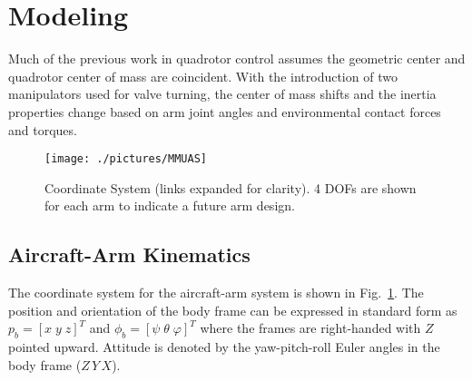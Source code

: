 \section{Modeling}\label{sec:model}
Much of the previous work in quadrotor control assumes the geometric center and quadrotor center of mass are coincident. With the introduction of two manipulators used for valve turning, the center of mass shifts and the inertia properties change based on arm joint angles and environmental contact forces and torques.

\begin{figure}
	\centering
	\texttt{[image: ./pictures/MMUAS]}
	\caption{Coordinate System (links expanded for clarity). 4 DOFs are shown for each arm to indicate a future arm design.}
	\label{fig:ref-frame}
\end{figure}

\subsection{Aircraft-Arm Kinematics}
The coordinate system for the aircraft-arm system is shown in Fig.~\ref{fig:ref-frame}.
The position and orientation of the body frame %
can be expressed in standard form as $p_b = [x \; y \; z]^T$ and $\phi_b = [\psi \; \theta \; \varphi]^T$ where the frames are right-handed with $Z$ pointed upward. Attitude is denoted by the yaw-pitch-roll Euler angles in the body frame ($Z\,Y\,X$). %


